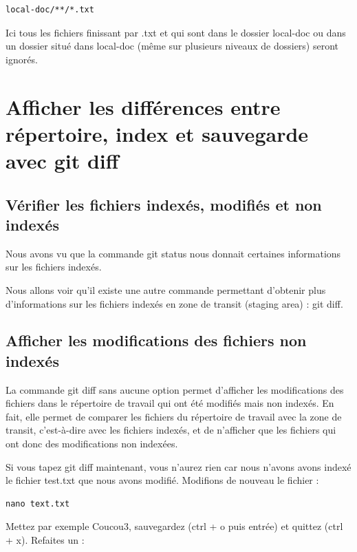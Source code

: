 \documentclass{article}
\begin{document}
\begin{verbatim}
local-doc/**/*.txt
\end{verbatim}

Ici tous les fichiers finissant par {\color{blue}.txt} et qui sont dans le dossier {\color{blue}local-doc} ou dans un dossier situé dans {\color{blue}local-doc} (même sur plusieurs niveaux de dossiers) seront ignorés.

\section{Afficher les différences entre répertoire, index et sauvegarde avec git diff}
\subsection{Vérifier les fichiers indexés, modifiés et non indexés}
Nous avons vu que la commande {\color{blue}git status} nous donnait certaines informations sur les fichiers indexés.

Nous allons voir qu'il existe une autre commande permettant d'obtenir plus d'informations sur les fichiers indexés en zone de transit ({\color{blue}staging area}) : {\color{blue}git diff}.

\subsection{Afficher les modifications des fichiers non indexés}
La commande {\color{blue}git diff} sans aucune option permet d'afficher les modifications des fichiers dans le répertoire de travail qui ont été modifiés mais non indexés. En fait, elle permet de comparer les fichiers du répertoire de travail avec la zone de transit, c'est-à-dire avec les fichiers indexés, et de n'afficher que les fichiers qui ont donc des modifications non indexées.

Si vous tapez {\color{blue}git diff} maintenant, vous n'aurez rien car nous n'avons avons indexé le fichier {\color{blue}test.txt} que nous avons modifié. Modifions de nouveau le fichier :

\begin{verbatim}
nano text.txt
\end{verbatim}

Mettez par exemple {\color{blue}Coucou3}, sauvegardez ({\color{blue}ctrl + o} puis entrée) et quittez ({\color{blue}ctrl + x}). Refaites un :
\end{document}
